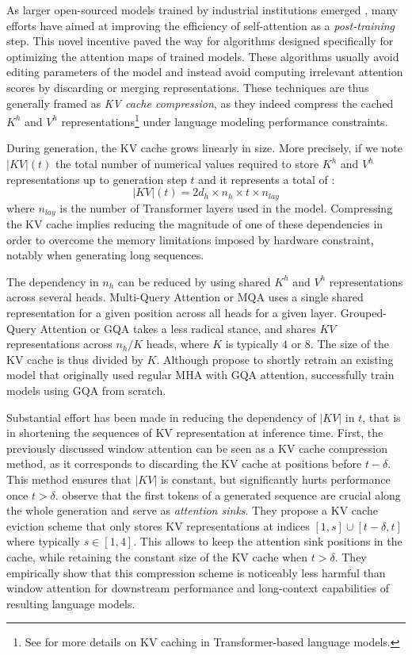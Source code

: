 As larger open-sourced models trained by industrial institutions emerged \citep{jiang2023mistral,touvron2023llama}, many efforts have aimed at improving the efficiency of self-attention as a \textit{post-training} step. This novel incentive paved the way for algorithms designed specifically for optimizing the attention maps of trained models. These algorithms usually avoid editing parameters of the model and instead avoid computing irrelevant attention scores by discarding or merging representations. These techniques are thus generally framed as \textit{KV cache compression}, as they indeed compress the cached $K^h$ and $V^h$ representations\footnote{See  for more details on KV caching in Transformer-based language models.} under language modeling performance constraints.

During generation, the KV cache grows linearly in size. More precisely, if we note $|KV|(t)$ the total number of numerical values required to store $K^h$ and $V^h$ representations up to generation step $t$ and it represents a total of :
$$
|KV|(t) = 2 d_h \times n_h \times t \times n_{lay}
$$
where $n_{lay}$ is the number of Transformer layers used in the model. Compressing the KV cache implies reducing the magnitude of one of these dependencies in order to overcome the memory limitations imposed by hardware constraint, notably when generating long sequences.

The dependency in $n_h$ can be reduced by using shared $K^h$ and $V^h$ representations across several heads. Multi-Query Attention or MQA \citep{shazeer2019fasttransformerdecodingwritehead} uses a single shared representation for a given position across all heads for a given layer. Grouped-Query Attention or GQA \citep{ainslie-etal-2023-gqa} takes a less radical stance, and shares $KV$ representations across $n_h / K$ heads, where $K$ is typically $4$ or $8$. The size of the KV cache is thus divided by $K$. Although \citet{ainslie-etal-2023-gqa} propose to shortly retrain an existing model that originally used regular MHA with GQA attention, \citet{touvron2023llama} successfully train models using GQA from scratch.

Substantial effort has been made in reducing the dependency of $|KV|$ in $t$, that is in shortening the sequences of KV representation at inference time. First, the previously discussed window attention \citep{beltagy2020longformer} can be seen as a KV cache compression method, as it corresponds to discarding the KV cache at positions before $t - \delta$. This method ensures that $|KV|$ is constant, but significantly hurts performance once $t > \delta$. \citet{xiao2024efficient} observe that the first tokens of a generated sequence are crucial along the whole generation and serve as \textit{attention sinks}. They propose a KV cache eviction scheme that only stores KV representations at indices $[1, s] \cup [t-\delta, t]$ where typically $s \in [1, 4]$. This allows to keep the attention sink positions in the cache, while retaining the constant size of the KV cache when $t > \delta$. They empirically show that this compression scheme is noticeably less harmful than window attention for downstream performance and long-context capabilities of resulting language models.

